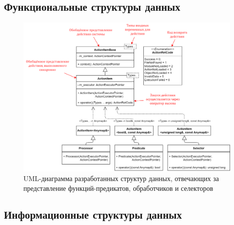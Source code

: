 ﻿%
\subsection{Функциональные структуры данных}
\begin{frame}
    \begin{figure}
        \smaller[1]
        \centering
        \includegraphics[height=0.75\textheight]{images/UML.graphFunctions.png}
        \caption{UML-диаграмма разработанных структур данных, отвечающих за представление функций-предикатов, обработчиков и селекторов}
    \end{figure}

\end{frame}
\subsection{Информационные структуры данных}
\begin{frame}

\end{frame}
